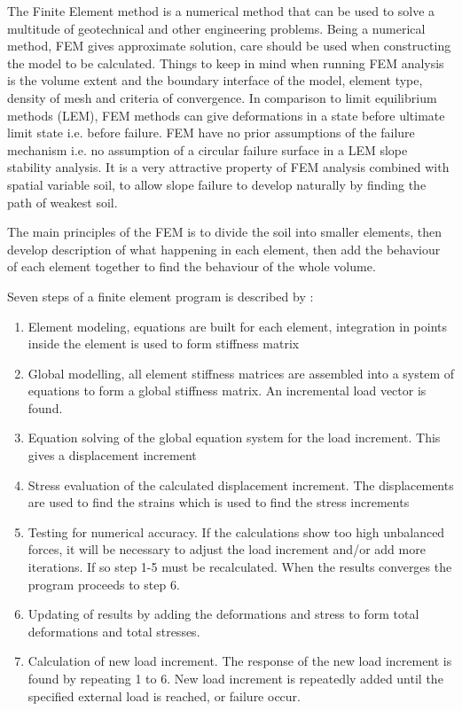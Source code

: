 The Finite Element method is a numerical method that can be used to solve a multitude of geotechnical and other engineering problems. 
Being a numerical method, FEM gives approximate solution, care should be used when constructing the model to be calculated. Things to keep in mind when running FEM analysis is the volume extent and the boundary interface of the model, element type, density of mesh and criteria of convergence.
In comparison to limit equilibrium methods (LEM), FEM methods can give deformations in a state before ultimate limit state i.e. before failure. 
FEM have no prior assumptions of the failure mechanism i.e. no assumption of a circular failure surface in a LEM slope stability analysis. It is a very attractive property of FEM analysis combined with spatial variable soil, to allow slope failure to develop naturally by finding the path of weakest soil.

The main principles of the FEM is to divide the soil into smaller elements, then develop description of what happening in each element, then add the behaviour of each element together to find the behaviour of the whole volume.

Seven steps of a finite element program is described by \citet{nordal2020compendium}:
\begin{enumerate}
	\item{Element modeling, equations are built for each element, integration in points inside the element is used to form stiffness matrix}
	\item{Global modelling, all element stiffness matrices are assembled into a system of equations to form a global stiffness matrix. An incremental load vector is found.}
	\item{Equation solving of the global equation system for the load increment. This gives a displacement increment}
	\item{Stress evaluation of the calculated displacement increment. The displacements are used to find the strains which is used to find the stress increments}
	\item{Testing for numerical accuracy. If the calculations show too high unbalanced forces, it will be necessary to adjust the load increment and/or add more iterations. If so step 1-5 must be recalculated. When the results converges the program proceeds to step 6.}
	\item{Updating of results by adding the deformations and stress to form total deformations and total stresses.}
	\item{Calculation of new load increment. The response of the new load increment is found by repeating 1 to 6. New load increment is repeatedly added until the specified external load is reached, or failure occur.}
\end{enumerate}
